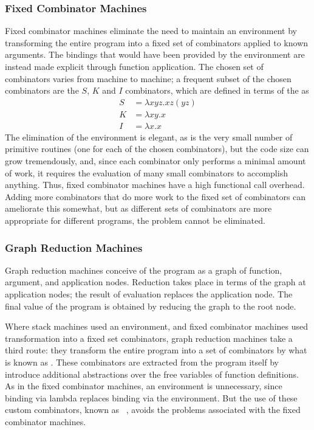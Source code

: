 \subsubsection[Fixed Combinator]{Fixed Combinator Machines}
Fixed combinator machines eliminate the need to maintain an environment by transforming the entire program into a fixed set of combinators applied to known arguments. The bindings that would have been provided by the environment are instead made explicit through function application. The chosen set of combinators varies from machine to machine; a frequent subset of the chosen combinators are the $S$, $K$ and $I$ combinators, which are defined in terms of the \lambdacalc as
\begin{align*}
S &= \lambda xyz. xz (yz)\\
K &= \lambda xy. x\\
I &= \lambda x. x
\end{align*}
The elimination of the environment is elegant, as is the very small number of primitive routines (one for each of the chosen combinators), but the code size can grow tremendously, and, since each combinator only performs a minimal amount of work, it requires the evaluation of many small combinators to accomplish anything. Thus, fixed combinator machines have a high functional call overhead. Adding more combinators that do more work to the fixed set of combinators can ameliorate this somewhat, but as different sets of combinators are more appropriate for different programs, the problem cannot be eliminated.

\subsubsection[Graph Reduction]{Graph Reduction Machines}
Graph reduction machines conceive of the program as a graph of function, argument, and application nodes. Reduction takes place in terms of the graph at application nodes; the result of evaluation replaces the application node. The final value of the program is obtained by reducing the graph to the root node.

Where stack machines used an environment, and fixed combinator machines used transformation into a fixed set combinators, graph reduction machines take a third route: they transform the entire program into a set of combinators by what is known as . These combinators are extracted from the program itself by introduce additional abstractions over the free variables of function definitions. As in the fixed combinator machines, an environment is unnecessary, since binding via lambda replaces binding via the environment. But the use of these custom combinators, known as ~\citep{Hughes:Super-combinators:1982}, avoids the problems associated with the fixed combinator machines.


